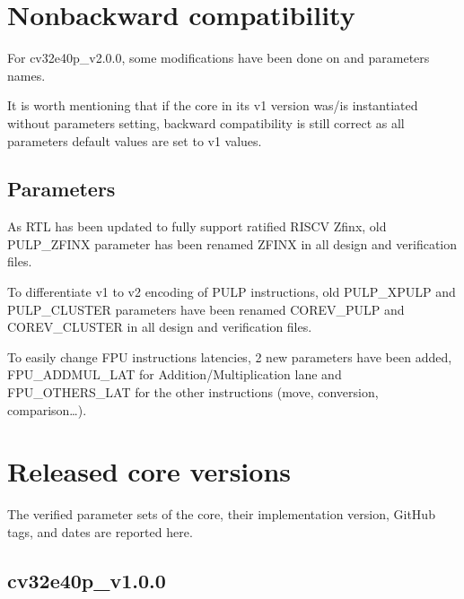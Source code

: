 \documentclass[letterpaper,10pt,english]{sphinxmanual}
\begin{document}
\section{Non\sphinxhyphen{}backward compatibility}
\label{\detokenize{core_versions:non-backward-compatibility}}\label{\detokenize{core_versions:backward-compatibility}}
\sphinxAtStartPar
For cv32e40p\_v2.0.0, some modifications have been done on  and  parameters names.

\sphinxAtStartPar
It is worth mentioning that if the core in its v1 version was/is instantiated without parameters setting, backward compatibility is still correct as all parameters default values are set to v1 values.


\subsection{Parameters}
\label{\detokenize{core_versions:parameters}}
\sphinxAtStartPar
As RTL has been updated to fully support ratified RISC\sphinxhyphen{}V Zfinx, old PULP\_ZFINX parameter has been renamed ZFINX in all design and verification files.

\sphinxAtStartPar
To differentiate v1 to v2 encoding of PULP instructions, old PULP\_XPULP and PULP\_CLUSTER parameters have been renamed COREV\_PULP and COREV\_CLUSTER in all design and verification files.

\sphinxAtStartPar
To easily change FPU instructions latencies, 2 new parameters have been added, FPU\_ADDMUL\_LAT for Addition/Multiplication lane and FPU\_OTHERS\_LAT for the other instructions (move, conversion, comparison…).


\section{Released core versions}
\label{\detokenize{core_versions:released-core-versions}}
\sphinxAtStartPar
The verified parameter sets of the core, their implementation version, GitHub tags, and dates are reported here.


\subsection{cv32e40p\_v1.0.0}
\label{\detokenize{core_versions:cv32e40p-v1-0-0}}
\end{document}
